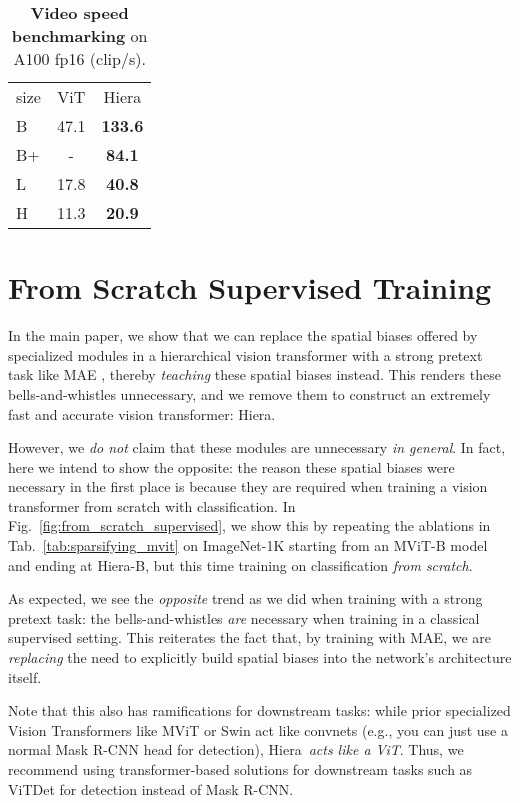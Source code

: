 \documentclass[nohyperref]{article}
\newcommand{\tablestyle}[2]{\setlength{\tabcolsep}{#1}\renewcommand{\arraystretch}{#2}\centering\footnotesize}
\newcommand{\shortname}{{Hiera}}
\theoremstyle{plain}
\theoremstyle{definition}
\theoremstyle{remark}
\begin{document}
\begin{table}[t!]
    \centering
    \tablestyle{15pt}{1.1}
        \begin{tabular}{lcc}
      size &  ViT & \shortname \\
      \shline
      B  & 47.1 & \bf 133.6 \\
      B+ & -    & \bf 84.1  \\
      L  & 17.8 & \bf 40.8  \\
      H  & 11.3 & \bf 20.9  \\
        \end{tabular}
\caption{{{\bf Video speed benchmarking} on A100 fp16 (clip/s)}. }
    \label{tab:video_speed_a100_fp16}
\end{table}



\section{From Scratch Supervised Training}
In the main paper, we show that we can replace the spatial biases offered by specialized modules in a hierarchical vision transformer with a strong pretext task like MAE \cite{mae}, thereby \textit{teaching} these spatial biases instead. This renders these bells-and-whistles unnecessary, and we remove them to construct an extremely fast and accurate vision transformer: \shortname{}.

However, we \textit{do not} claim that these modules are unnecessary \textit{in general}. In fact, here we intend to show the opposite: the reason these spatial biases were necessary in the first place is because they are required when training a vision transformer from scratch with classification. In Fig.~\ref{fig:from_scratch_supervised}, we show this by repeating the ablations in Tab.~\ref{tab:sparsifying_mvit} on ImageNet-1K starting from an MViT-B model and ending at \shortname{-B}, but this time training on classification \textit{from scratch}.

As expected, we see the \textit{opposite} trend as we did when training with a strong pretext task: the bells-and-whistles \textit{are} necessary when training in a classical supervised setting. This reiterates the fact that, by training with MAE, we are \textit{replacing} the need to explicitly build spatial biases into the network's architecture itself.

Note that this also has ramifications for downstream tasks: while prior specialized Vision Transformers like MViT or Swin act like convnets (e.g., you can just use a normal Mask R-CNN \cite{maskrcnn} head for detection), \shortname{}~\textit{acts like a ViT}. Thus, we recommend using transformer-based solutions for downstream tasks such as ViTDet \cite{vitdet} for detection instead of Mask R-CNN.
\end{document}
